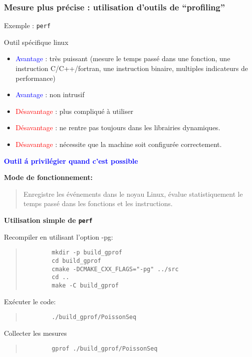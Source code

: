 \documentclass{beamer}
\begin{document}
\begin{frame}
	\frametitle{Mesure plus pr\'ecise : utilisation d'outils de ``profiling''}
	
	Exemple : {\tt perf}
	
	\vfill
	Outil spécifique linux
	
	\begin{itemize}
		\item \textcolor{blue}{Avantage} : tr\`es puissant (mesure le temps pass\'e dans une fonction, une instruction C/C++/fortran, une instruction binaire, multiples indicateurs de performance)
		\item \textcolor{blue}{Avantage} : non intrusif
		\item \textcolor{red}{D\'esavantage} : plus compliqu\'e \`a utiliser
		\item \textcolor{red}{D\'esavantage} : ne rentre pas toujours dans les librairies dynamiques.
		\item \textcolor{red}{D\'esavantage} : n\'ecessite que la machine soit configur\'ee  correctement.
	\end{itemize}
	\vfill
	\textcolor{blue}{\bf Outil \'a privil\'egier quand c'est possible}
\end{frame}
\begin{frame}[fragile]
	
	{\bf 	Mode de fonctionnement:}
	\begin{quote}
		Enregistre les \'ev\'enements dans le noyau Linux, \'evalue statistiquement le temps pass\'e dans les fonctions et les instructions.
	\end{quote} 
	
	\vfill
	{\bf Utilisation simple de {\tt perf}}
	\vfill
	
	Recompiler en utilisant l'option -pg:
	\begin{quote}
		\begin{verbatim}
		mkdir -p build_gprof
		cd build_gprof
		cmake -DCMAKE_CXX_FLAGS="-pg" ../src
		cd ..
		make -C build_gprof
		\end{verbatim}
	\end{quote} 
	
	Exécuter le code:
	\begin{quote}
		\begin{verbatim}
		./build_gprof/PoissonSeq
		\end{verbatim}
	\end{quote}
	
	Collecter les mesures
	\begin{quote}
		\begin{verbatim}
		gprof ./build_gprof/PoissonSeq
		\end{verbatim}
	\end{quote}
	
\end{frame}
\end{document}
